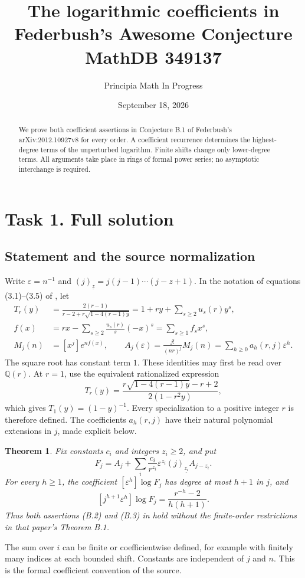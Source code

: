 \documentclass[11pt]{article}
\title{The logarithmic coefficients in Federbush's Awesome Conjecture\\
\large MathDB 349137}
\author{Principia Math In Progress}
\date{September 18, 2026}
\newtheorem{theorem}{Theorem}
\newcommand{\ff}[2]{(#1)_{\underline{#2}}}
\newcommand{\eps}{\varepsilon}
\begin{document}
\maketitle
\begin{abstract}
We prove both coefficient assertions in Conjecture B.1 of
Federbush's arXiv:2012.10927v8 for every order. A coefficient recurrence
determines the highest-degree terms of the unperturbed logarithm.
Finite shifts change only lower-degree terms. All arguments take place
in rings of formal power series; no asymptotic interchange is required.
\end{abstract}

\section*{Task 1. Full solution}
\subsection*{Statement and the source normalization}
Write $\eps=n^{-1}$ and $\ff{j}{z}=j(j-1)\cdots(j-z+1)$.
In the notation of equations (3.1)--(3.5) of \cite{fed}, let
\begin{align}
 T_r(y)&=\frac{2(r-1)}{r-2+r\sqrt{1-4(r-1)y}}
       =1+ry+\sum_{s\ge2}u_s(r)y^s,\label{eq:T}\\
 f(x)&=rx-\sum_{s\ge2}\frac{u_s(r)}s(-x)^s
       =\sum_{s\ge1}f_sx^s,\label{eq:f}\\
 M_j(n)&=[x^j]e^{nf(x)},\qquad
 A_j(\eps)=\frac{j!}{(nr)^j}M_j(n)
          =\sum_{h\ge0}a_h(r,j)\eps^h.\label{eq:A}
\end{align}
The square root has constant term $1$. These identities may first be
read over $\mathbb Q(r)$. At $r=1$, use the equivalent rationalized
expression
\[
 T_r(y)=\frac{r\sqrt{1-4(r-1)y}-r+2}{2(1-r^2y)},
\]
which gives $T_1(y)=(1-y)^{-1}$. Every specialization to a positive
integer $r$ is therefore defined. The coefficients $a_h(r,j)$ have
their natural polynomial extensions in $j$, made explicit below.

\begin{theorem}\label{thm:main}
Fix constants $c_i$ and integers $z_i\ge2$, and put
\[
 F_j=A_j+\sum_i\frac{c_i}{r^{z_i}}
                   \eps^{z_i}\ff{j}{z_i}A_{j-z_i}.
\]
For every $h\ge1$, the coefficient $[\eps^h]\log F_j$ has degree at
most $h+1$ in $j$, and
\begin{equation}\label{eq:answer}
 [j^{h+1}\eps^h]\log F_j
       =\frac{r^{-h}-2}{h(h+1)}.
\end{equation}
Thus both assertions (B.2) and (B.3) in \cite{fed} hold without the
finite-order restrictions in that paper's Theorem B.1.
\end{theorem}
The sum over $i$ can be finite or coefficientwise defined, for example
with finitely many indices at each bounded shift. Constants are
independent of $j$ and $n$. This is the formal coefficient convention
of the source.
\end{document}
